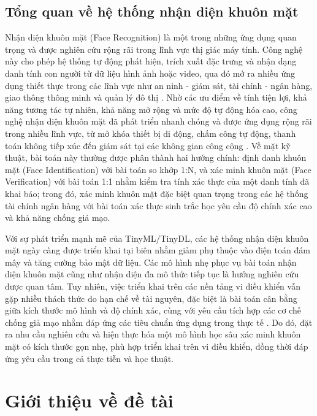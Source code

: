 \subsection{Tổng quan về hệ thống nhận diện khuôn mặt}
Nhận diện khuôn mặt (Face Recognition) là một trong những ứng dụng quan trọng và được nghiên cứu rộng rãi trong lĩnh vực thị giác máy tính. Công nghệ này cho phép hệ thống tự động phát hiện, trích xuất đặc trưng và nhận dạng danh tính con người từ dữ liệu hình ảnh hoặc video, qua đó mở ra nhiều ứng dụng thiết thực trong các lĩnh vực như an ninh - giám sát, tài chính - ngân hàng, giao thông thông minh và quản lý đô thị \cite{30_9145558,ibm_2025_biometric}. Nhờ các ưu điểm về tính tiện lợi, khả năng tương tác tự nhiên, khả năng mở rộng và mức độ tự động hóa cao, công nghệ nhận diện khuôn mặt đã phát triển nhanh chóng và được ứng dụng rộng rãi trong nhiều lĩnh vực, từ mở khóa thiết bị di động, chấm công tự động, thanh toán không tiếp xúc đến giám sát tại các không gian công cộng \cite{17_10128985}. Về mặt kỹ thuật, bài toán này thường được phân thành hai hướng chính: định danh khuôn mặt (Face Identification) với bài toán so khớp 1:N, và xác minh khuôn mặt (Face Verification) với bài toán 1:1 nhằm kiểm tra tính xác thực của một danh tính đã khai báo; trong đó, xác minh khuôn mặt đặc biệt quan trọng trong các hệ thống tài chính ngân hàng với bài toán xác thực sinh trắc học yêu cầu độ chính xác cao và khả năng chống giả mạo. \cite{2_electronics9081188,techcombank_2025_xc}

Với sự phát triển mạnh mẽ của TinyML/TinyDL, các hệ thống nhận diện khuôn mặt ngày càng được triển khai tại biên nhằm giảm phụ thuộc vào điện toán đám mây và tăng cường bảo mật dữ liệu. Các mô hình nhẹ phục vụ bài toán nhận diện khuôn mặt cũng như nhận diện đa mô thức tiếp tục là hướng nghiên cứu được quan tâm. Tuy nhiên, việc triển khai trên các nền tảng vi điều khiển vẫn gặp nhiều thách thức do hạn chế về tài nguyên, đặc biệt là bài toán cân bằng giữa kích thước mô hình và độ chính xác, cùng với yêu cầu tích hợp các cơ chế chống giả mạo nhằm đáp ứng các tiêu chuẩn ứng dụng trong thực tế \cite{35_10457480,36_11134957}. Do đó, đặt ra nhu cầu nghiên cứu và hiện thực hóa một mô hình học sâu xác minh khuôn mặt có kích thước gọn nhẹ, phù hợp triển khai trên vi điều khiển, đồng thời đáp ứng yêu cầu trong cả thực tiễn và học thuật.

\section{Giới thiệu về đề tài}
